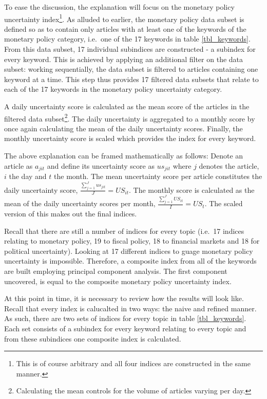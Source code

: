 \documentclass[11pt,preprint, authoryear]{elsarticle}
\numberwithin{equation}{section}
\numberwithin{figure}{section}
\numberwithin{table}{section}
\let\rmarkdownfootnote\footnote%
\def\footnote{\protect\rmarkdownfootnote}
\begin{document}
To ease the discussion, the explanation will focus on the monetary
policy uncertainty index\footnote{This is of course arbitrary and all
  four indices are constructed in the same manner.}. As alluded to
earlier, the monetary policy data subset is defined so as to contain
only articles with at least one of the keywords of the monetary policy
category, i.e.~one of the 17 keywords in table \ref{tbl_keywords}. From
this data subset, 17 individual subindices are constructed - a subindex
for every keyword. This is achieved by applying an additional filter on
the data subset: working sequentially, the data subset is filtered to
articles containing one keyword at a time. This step thus provides 17
filtered data subsets that relate to each of the 17 keywords in the
monetary policy uncertainty category.

A daily uncertainty score is calculated as the mean score of the
articles in the filtered data subset\footnote{Calculating the mean
  controls for the volume of articles varying per day.}. The daily
uncertainty is aggregated to a monthly score by once again calculating
the mean of the daily uncertainty scores. Finally, the monthly
uncertainty score is scaled which provides the index for every keyword.

The above explanation can be framed mathematically as follows: Denote an
article as \(a_{jit}\) and define its uncertainty score as \(us_{jit}\)
where \(j\) denotes the article, \(i\) the day and \(t\) the month. The
mean uncertainty score per article constitutes the daily uncertainty
score, \(\frac{\sum_{j=1}^Jus_{jit}}{J}= US_{it}\). The monthly score is
calculated as the mean of the daily uncertainty scores per month,
\(\frac{\sum_{j=1}^JUS_{it}}{I}= US_{t}\). The scaled version of this
makes out the final indices.

Recall that there are still a number of indices for every topic (i.e.~17
indices relating to monetary policy, 19 to fiscal policy, 18 to
financial markets and 18 for political uncertainty). Looking at 17
different indices to guage monetary policy uncertainty is impossible.
Therefore, a composite index from all of the keywords are built
employing principal component analysis. The first component uncovered,
is equal to the composite monetary policy uncertainty index.

At this point in time, it is necessary to review how the results will
look like. Recall that every index is calucalted in two ways: the naive
and refined manner. As such, there are two sets of indices for every
topic in table \ref{tbl_keywords}. Each set consists of a subindex for
every keyword relating to every topic and from these subindices one
composite index is calculated.
\end{document}
